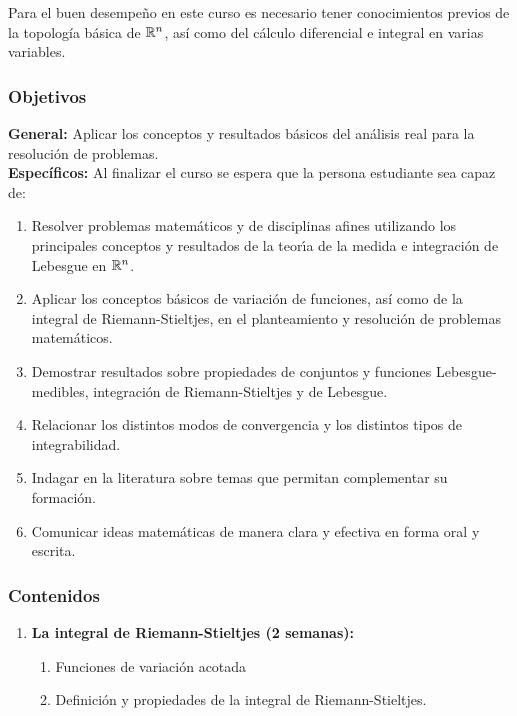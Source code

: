 \begin{refsection}
Para el buen desempeño en este curso es necesario tener conocimientos previos de la topología básica de $\mathbb{R}^n$, así como del cálculo diferencial e integral en varias variables.



\subsubsection*{Objetivos}

\textbf{General:} Aplicar los conceptos y resultados básicos del análisis real para la resolución de problemas. \\

\textbf{Específicos:} Al finalizar el curso se espera que la persona estudiante sea capaz de:

\begin{enumerate}
\item Resolver problemas matemáticos y de disciplinas afines utilizando los principales conceptos y resultados de la teor\'{\i}a de la medida e integraci\'{o}n de Lebesgue en $\mathbb{R}^n$.
\item Aplicar los conceptos b\'asicos de variaci\'on de funciones, as\'i como de la integral de Riemann-Stieltjes, en el planteamiento y resoluci\'on de problemas matem\'aticos.
\item Demostrar resultados sobre propiedades de conjuntos y funciones Lebesgue-medibles, integración de Riemann-Stieltjes y de Lebesgue.
\item Relacionar los distintos modos de convergencia y los distintos tipos de integrabilidad.
\item Indagar en la literatura sobre temas que permitan complementar su formación.
\item Comunicar ideas matemáticas de manera clara y efectiva en forma oral y escrita.
\end{enumerate}

\newpage 

\subsubsection*{Contenidos}

\begin{enumerate}
\item \textbf{La integral de Riemann-Stieltjes (2 semanas):} 
\begin{enumerate}
    \item Funciones de variación acotada
    \item Definición y propiedades de la integral de Riemann-Stieltjes.
\end{enumerate}


\end{enumerate}
\end{refsection}
